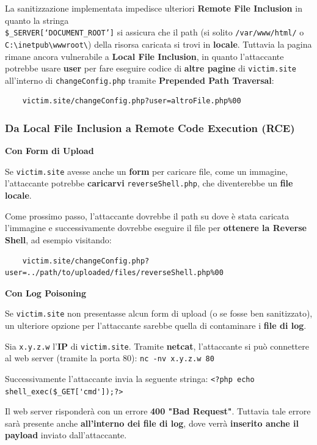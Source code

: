\documentclass{article}
\begin{document}
La sanitizzazione implementata impedisce ulteriori \textbf{Remote File Inclusion} in quanto la stringa\\ \verb|$_SERVER[‘DOCUMENT_ROOT’]| si assicura che il path (si solito \verb|/var/www/html/| o \verb|C:\inetpub\wwwroot\|) della risorsa caricata si trovi in \textbf{locale}.
\newpage
Tuttavia la pagina rimane ancora vulnerabile a \textbf{Local File Inclusion}, in quanto l'attaccante potrebbe usare \textbf{user} per fare eseguire codice di \textbf{altre pagine} di \verb|victim.site| all'interno di \verb|changeConfig.php| tramite \textbf{Prepended Path Traversal}:
\begin{verbatim}
	victim.site/changeConfig.php?user=altroFile.php%00
\end{verbatim}

\subsubsection{Da Local File Inclusion a Remote Code Execution (RCE)}
\textbf{Con Form di Upload}

Se \verb|victim.site| avesse anche un \textbf{form} per caricare file, come un immagine, l'attaccante potrebbe \textbf{caricarvi} \verb|reverseShell.php|, che diventerebbe un \textbf{file locale}.

Come prossimo passo, l'attaccante dovrebbe il path su dove è stata caricata l'immagine e successivamente dovrebbe eseguire il file per \textbf{ottenere la Reverse Shell}, ad esempio visitando:
\begin{verbatim}
	victim.site/changeConfig.php?user=../path/to/uploaded/files/reverseShell.php%00
\end{verbatim}

\textbf{Con Log Poisoning}

Se \verb|victim.site| non presentasse alcun form di upload (o se fosse ben sanitizzato), un ulteriore opzione per l'attaccante sarebbe quella di contaminare i \textbf{file di log}.

Sia \verb|x.y.z.w| l'\textbf{IP} di \verb|victim.site|. Tramite \textbf{netcat}, l'attaccante si può connettere al web server (tramite la porta 80): \verb|nc -nv x.y.z.w 80|

Successivamente l'attaccante invia la seguente stringa:
\verb|<?php echo shell_exec($_GET['cmd']);?>|

Il web server risponderà con un errore \textbf{400 "Bad Request"}. Tuttavia tale errore sarà presente anche \textbf{all’interno dei file di log}, dove verrà \textbf{inserito anche il payload} inviato dall’attaccante. 
\end{document}
